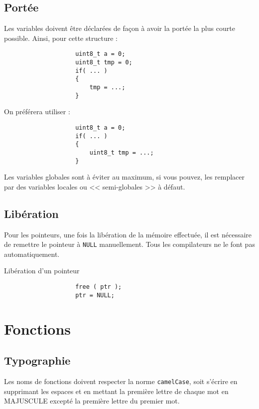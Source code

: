 		\subsection{Portée}
			Les variables doivent être déclarées de façon à avoir la portée la plus courte possible. Ainsi, pour cette structure :

			\begin{cbox}{}
				\begin{verbatim}
					uint8_t a = 0;
					uint8_t tmp = 0;
					if( ... )
					{
						tmp = ...;
					}
				\end{verbatim}
			\end{cbox}

			On préférera utiliser : 

			\begin{cbox}{}
				\begin{verbatim}
					uint8_t a = 0;
					if( ... )
					{
						uint8_t tmp = ...;
					}
				\end{verbatim}
			\end{cbox}

			Les variables globales sont à éviter au maximum, si vous pouvez, les remplacer par des variables locales ou << semi-globales >> à défaut.

		\subsection{Libération}
			Pour les pointeurs, une fois la libération de la mémoire effectuée, il est nécessaire de remettre le pointeur à \verb+NULL+ manuellement. Tous les compilateurs ne le font pas automatiquement.

			\begin{cbox}{Libération d'un pointeur}
				\begin{verbatim}
					free ( ptr );
					ptr = NULL;
				\end{verbatim}
			\end{cbox}

	\section{Fonctions}
		\subsection{Typographie}
			Les noms de fonctions doivent respecter la norme \verb+camelCase+, soit s'écrire en supprimant les espaces et en mettant la première lettre de chaque mot en MAJUSCULE excepté la première lettre du premier mot.

